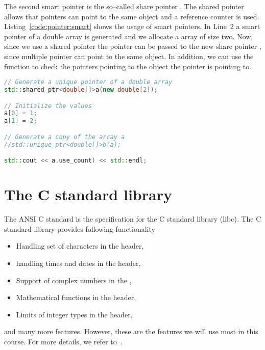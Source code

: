 The second smart pointer is the so--called share pointer . The shared pointer allows that pointers can point to the same object and a reference counter is used. Listing~\ref{code:pointer:smart} shows the usage of smart pointers. In Line~2 a smart pointer of a double array is generated and we allocate a array of size two. Now, since we use a shared pointer the pointer  can be passed to the new share pointer , since multiple pointer can point to the same object. In addition, we can use the function  to check the pointers pointing to the object the pointer  is pointing to. 


\begin{lstlisting}[language=c++,caption={Using the smart unique pointer.
\label{code:pointer:smart}},float,floatplacement=tb]
// Generate a unique pointer of a double array
std::shared_ptr<double[]>a(new double[2]);

// Initialize the values
a[0] = 1;
a[1] = 2;

// Generate a copy of the array a
//std::unique_ptr<double[]>b(a);

std::cout << a.use_count) << std::endl;
\end{lstlisting}


\newpage
\printendnotes

\chapter{The C standard library}
\label{chapter:cpp:lib}
The ANSI C standard is the specification for the C standard library (libc). The C standard library provides following functionality
\begin{itemize}
\item Handling set of characters in the  header,
\item handling times and dates in the  header,
\item Support of complex numbers in the ,
\item Mathematical functions in the  header,
\item Limits of integer types in the  header,
\end{itemize}
and many more features. However, these are the features we will use most in this course. For more details, we refer to~\cite{josuttis2012c++}.

